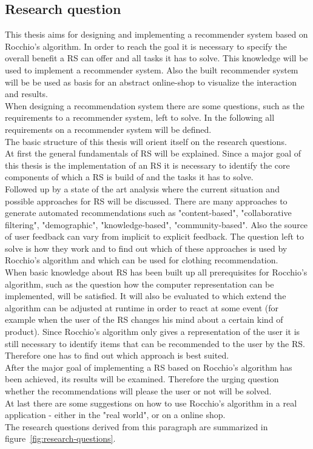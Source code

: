 \subsection{Research question}
This thesis aims for designing and implementing a recommender system based on Rocchio's algorithm.
In order to reach the goal it is necessary to specify the overall benefit a RS can offer and all tasks it has to solve.
This knowledge will be used to implement a recommender system.
Also the built recommender system will be be used as basis for an abstract online-shop to visualize the interaction and results.
\\
When designing a recommendation system there are some questions, such as the requirements to a recommender system, left to solve.
In the following all requirements on a recommender system will be defined.
\\
The basic structure of this thesis will orient itself on the research questions.
\\
At first the general fundamentals of RS will be explained.
Since a major goal of this thesis is the implementation of an RS it is necessary to identify the core components of which a RS is build of and the tasks it has to solve.
\\
Followed up by a state of the art analysis where the current situation and possible approaches for RS will be discussed.
There are many approaches to generate automated recommendations such as "content-based", "collaborative filtering", "demographic", "knowledge-based", "community-based".\citep[p.~10-12]{ricci:2011}
Also the source of user feedback can vary from implicit to explicit feedback.\citep[p.~76]{lops:2011}
The question left to solve is how they work and to find out which of these approaches is used by Rocchio's algorithm and which can be used for clothing recommendation.
\\
When basic knowledge about RS has been built up all prerequisites for Rocchio's algorithm, such as the question how the computer representation can be implemented, will be satisfied.
It will also be evaluated to which extend the algorithm can be adjusted at runtime in order to react at some event (for example when the user of the RS changes his mind about a certain kind of product).
Since Rocchio's algorithm only gives a representation of the user it is still necessary to identify items that can be recommended to the user by the RS.
Therefore one has to find out which approach is best suited.
\\
After the major goal of implementing a RS based on Rocchio's algorithm has been achieved, its results will be examined.
Therefore the urging question whether the recommendations will please the user or not will be solved.
\\
At last there are some suggestions on how to use Rocchio's algorithm in a real application - either in the "real world", or on a online shop.
\\
The research questions derived from this paragraph are summarized in figure~\ref{fig:research-questions}.



